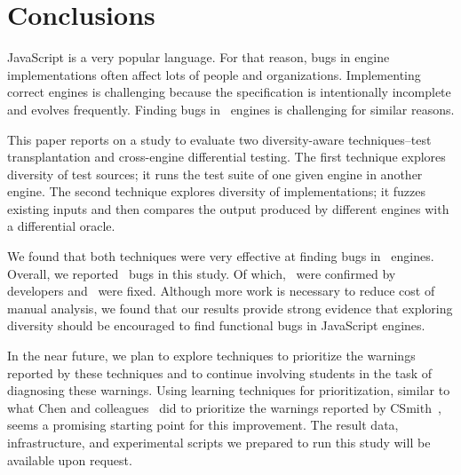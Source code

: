 \documentclass[sigconf,review, anonymous]{acmart}
\begin{document}
\section{Conclusions}


JavaScript is a very popular language. For that reason, bugs in engine
implementations often affect lots of people and organizations.
Implementing correct engines is challenging because the specification
is intentionally incomplete and evolves frequently. Finding bugs in
\js\ engines is challenging for similar reasons.

This paper reports on a study to evaluate two diversity-aware
techniques--test transplantation and cross-engine differential
testing. The first technique explores diversity of test sources; it
runs the test suite of one given engine in another engine. The second
technique explores diversity of implementations; it fuzzes existing
inputs and then compares the output produced by different engines with
a differential oracle.

We found that both techniques were very effective at finding bugs in
\js\ engines.  Overall, we reported \totalBugsReported\ bugs in this
study. Of which, \totalBugsConfirmed\ were confirmed by developers and
\totalBugsFixed\ were fixed. Although more work is necessary to reduce
cost of manual analysis, we found that our results provide strong
evidence that exploring diversity should be encouraged to find
functional bugs in JavaScript engines.

In the near future, we plan to explore techniques to prioritize the
warnings reported by these techniques and to continue involving
students in the task of diagnosing these warnings. Using learning
techniques for prioritization, similar to what Chen and
colleagues~\cite{Chen:2017:LPT:3097368.3097451} did to prioritize the
warnings reported by CSmith~\cite{Yang:2011:FUB:1993498.1993532},
seems a promising starting point for this improvement. The result
data, infrastructure, and experimental scripts we prepared to run this
study will be available upon request.

\balance 

\end{document}
